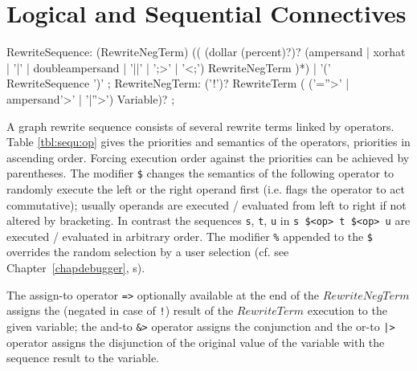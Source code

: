\section{Logical and Sequential Connectives}

\makeatletter

\begin{rail}
  RewriteSequence: 
    (RewriteNegTerm) (( (dollar (percent)?)? (ampersand | xorhat | '|' | doubleampersand | '||' | ';>' | '<;') RewriteNegTerm )*)
|    '(' RewriteSequence ')'
	;
  RewriteNegTerm: 
    ('!')? RewriteTerm ( ('=''>' | ampersand'>' | '|''>') Variable)?
	;
\end{rail}

A graph rewrite sequence consists of several rewrite terms linked by operators.
Table \ref{tbl:sequ:op} gives the priorities and semantics of the operators, priorities in ascending order.
Forcing execution order against the priorities can be achieved by parentheses.
The modifier \texttt{\$} changes the semantics of the following operator to randomly execute the left or the right operand first (i.e. flags the operator to act commutative);
usually operands are executed / evaluated from left to right if not altered by bracketing.
In contrast the sequences \texttt{s}, \texttt{t}, \texttt{u} in \texttt{s \$<op> t \$<op> u} are executed / evaluated in arbitrary order.
The modifier \texttt{\%} appended to the \texttt{\$} overrides the random selection by a user selection (cf. see Chapter~\ref{chapdebugger}, s).

The assign-to operator \texttt{=>} optionally available at the end of the $RewriteNegTerm$ assigns the (negated in case of \texttt{!}) result of the $RewriteTerm$ execution to the given variable; the and-to \texttt{\&>} operator assigns the conjunction and the or-to \texttt{|>} operator assigns the disjunction of the original value of the variable with the sequence result to the variable.

